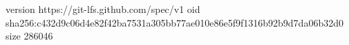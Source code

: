 version https://git-lfs.github.com/spec/v1
oid sha256:c432d9c06d4e82f42ba7531a305bb77ae010e86e5f9f1316b92b9d7da06b32d0
size 286046
